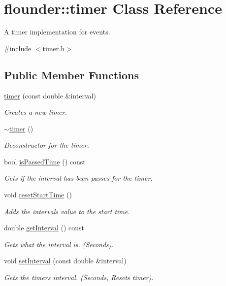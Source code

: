 \hypertarget{classflounder_1_1timer}{}\section{flounder\+:\+:timer Class Reference}
\label{classflounder_1_1timer}


A timer implementation for events.  




{\ttfamily \#include $<$timer.\+h$>$}

\subsection*{Public Member Functions}
\begin{DoxyCompactItemize}
\item 
\hyperlink{classflounder_1_1timer_afbe92e026c43d2cacb8172963e4ab6d9}{timer} (const double \&interval)
\begin{DoxyCompactList}\small\item\em Creates a new timer. \end{DoxyCompactList}\item 
\hyperlink{classflounder_1_1timer_a2644c550b3bb6aa1c757287a72ff9179}{$\sim$timer} ()
\begin{DoxyCompactList}\small\item\em Deconstructor for the timer. \end{DoxyCompactList}\item 
bool \hyperlink{classflounder_1_1timer_a35d709d12d0f7f921d1f00b314d69685}{is\+Passed\+Time} () const
\begin{DoxyCompactList}\small\item\em Gets if the interval has been passes for the timer. \end{DoxyCompactList}\item 
void \hyperlink{classflounder_1_1timer_af71405c5ec11d085c91aa26d6a8d994c}{reset\+Start\+Time} ()
\begin{DoxyCompactList}\small\item\em Adds the intervals value to the start time. \end{DoxyCompactList}\item 
double \hyperlink{classflounder_1_1timer_a9b12cbab2d78c9525873c32d8d0d5e93}{get\+Interval} () const
\begin{DoxyCompactList}\small\item\em Gets what the interval is. (Seconds). \end{DoxyCompactList}\item 
void \hyperlink{classflounder_1_1timer_a801b9883c757b92eaa957f3222c4791d}{set\+Interval} (const double \&interval)
\begin{DoxyCompactList}\small\item\em Gets the timers interval. (Seconds, Resets timer). \end{DoxyCompactList}\end{DoxyCompactItemize}
